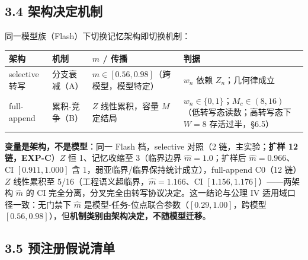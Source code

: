 \documentclass[
]{ctexart}
\begin{document}
\subsection{3.4
架构决定机制}\label{ux67b6ux6784ux51b3ux5b9aux673aux5236}

同一模型族（Flash）下切换记忆架构即切换机制：

{\def\LTcaptype{} %
\begin{longtable}[]{@{}
  >{\raggedright\arraybackslash}p{}
  >{\raggedright\arraybackslash}p{}
  >{\raggedright\arraybackslash}p{}
  >{\raggedright\arraybackslash}p{}@{}}
\toprule\noalign{}
\begin{minipage}[b]{\linewidth}\raggedright
架构
\end{minipage} & \begin{minipage}[b]{\linewidth}\raggedright
机制
\end{minipage} & \begin{minipage}[b]{\linewidth}\raggedright
\(\hat m\) / 传播
\end{minipage} & \begin{minipage}[b]{\linewidth}\raggedright
判据
\end{minipage} \\
\midrule\noalign{}
\endhead
\bottomrule\noalign{}
\endlastfoot
selective 转写 & 分支衰减（A） &
\(\hat m\in[0.56,0.98]\)（跨模型，模型特定） & \(w_n\) 依赖
\(Z_n\)；几何律成立 \\
full-append & 累积-竞争（B） & \(Z\) 线性累积，容量 \(M\) 定结局 &
\(w_n\in\{0,1\}\)；\(M_c\in(8,16)\)（低转写态读数；高转写态下 \(W{=}8\)
存活过半，§6.5） \\
\end{longtable}
}

\textbf{变量是架构，不是模型}：同一 Flash 档，selective 对照（2
链，主实验；\textbf{扩样 12 链，EXP-C}）\(Z\) 恒 1、记忆收缩至
3（临界边界 \(\hat m=1.0\)；扩样后 \(\hat m=0.966\)、CI
\([0.911,1.000]\) 含 1，弱亚临界/临界保持统计成立），full-append C0（12
链）\(Z\) 线性累积至 5/16（工程语义超临界，\(\hat m=1.166\)、CI
\([1.156,1.176]\)）------两架构 \(\hat m\) 的 CI
完全分离，分叉完全由转写协议决定。这一结论与公理 IV
适用域口径一致：无门禁下 \(\hat m\)
是模型-任务-位点联合参数（\([0.29,1.00]\)，跨模型
\([0.56,0.98]\)），但\textbf{机制类别由架构决定，不随模型迁移}。

\subsection{3.5
预注册假说清单}\label{ux9884ux6ce8ux518cux5047ux8bf4ux6e05ux5355}
\end{document}
